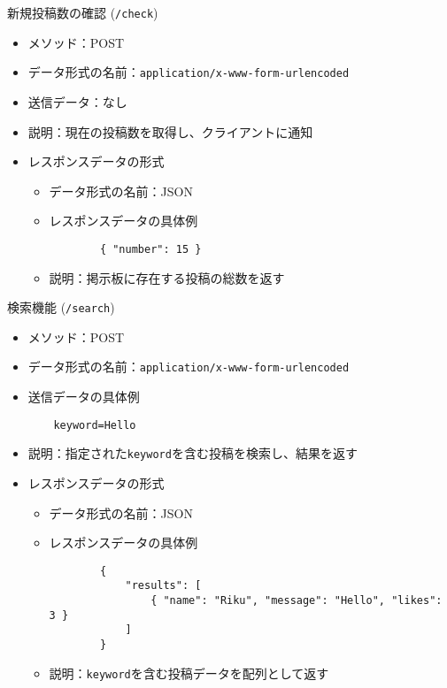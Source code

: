\documentclass[uplatex,dvipdfmx]{jsarticle}
\begin{document}
新規投稿数の確認 (\texttt{/check})
\begin{itemize}
    \item メソッド：POST
    \item データ形式の名前：\texttt{application/x-www-form-urlencoded}
    \item 送信データ：なし
    \item 説明：現在の投稿数を取得し、クライアントに通知
    \item レスポンスデータの形式
    \begin{itemize}
        \item データ形式の名前：JSON
        \item レスポンスデータの具体例
        \begin{verbatim}
        { "number": 15 }
        \end{verbatim}
        \item 説明：掲示板に存在する投稿の総数を返す
    \end{itemize}
\end{itemize}

検索機能 (\texttt{/search})
\begin{itemize}
    \item メソッド：POST
    \item データ形式の名前：\texttt{application/x-www-form-urlencoded}
    \item 送信データの具体例
    \begin{verbatim}
    keyword=Hello
    \end{verbatim}
    \item 説明：指定された\texttt{keyword}を含む投稿を検索し、結果を返す
    \item レスポンスデータの形式
    \begin{itemize}
        \item データ形式の名前：JSON
        \item レスポンスデータの具体例
        \begin{verbatim}
        {
            "results": [
                { "name": "Riku", "message": "Hello", "likes": 3 }
            ]
        }
        \end{verbatim}
        \item 説明：\texttt{keyword}を含む投稿データを配列として返す
    \end{itemize}
\end{itemize}
\end{document}
